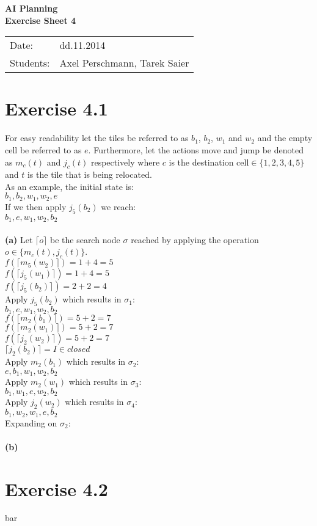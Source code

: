 \documentclass[11pt,a4paper]{article}
\begin{document}
\begin{center}
\Huge{\textbf{AI Planning}}\\
\LARGE{\textbf{Exercise Sheet 4}}
\end{center}
\vspace{2cm}
\begin{tabular}{ll}
Date: & dd.11.2014\\
Students: & Axel Perschmann, Tarek Saier
\end{tabular}

\section*{Exercise 4.1}
For easy readability let the tiles be referred to as $b_1$, $b_2$, $w_1$ and $w_2$ and the empty cell be referred to as $e$. Furthermore, let the actions move and jump be denoted as $m_c(t)$ and $j_c(t)$ respectively where $c$ is the destination cell$\in \{1,2,3,4,5\}$ and $t$ is the tile that is being relocated.\\
As an example, the initial state is:\\
$b_1,b_2,w_1,w_2,e$\\
If we then apply $j_5(b_2)$ we reach:\\
$b_1,e,w_1,w_2,b_2$\\
\\
\textbf{(a)} Let $\lceil o\rceil$ be the search node $\sigma$ reached by applying the operation $o\in \{m_c(t),j_c(t)\}$.\\
$f(\lceil m_5(w_2)\rceil)=1+4=5$\\
$f(\lceil j_5(w_1)\rceil)=1+4=5$\\
$f(\lceil j_5(b_2)\rceil)=2+2=4$\\
Apply $j_5(b_2)$ which results in $\sigma_1$:\\
$b_1,e,w_1,w_2,b_2$\\
$f(\lceil m_2(b_1)\rceil)=5+2=7$\\
$f(\lceil m_2(w_1)\rceil)=5+2=7$\\
$f(\lceil j_2(w_2)\rceil)=5+2=7$\\
$\lceil j_2(b_2)\rceil=I\in closed$\\
Apply $m_2(b_1)$ which results in $\sigma_2$:\\
$e,b_1,w_1,w_2,b_2$\\
Apply $m_2(w_1)$ which results in $\sigma_3$:\\
$b_1,w_1,e,w_2,b_2$\\
Apply $j_2(w_2)$ which results in $\sigma_4$:\\
$b_1,w_2,w_1,e,b_2$\\
Expanding on $\sigma_2$:\\
\\
\textbf{(b)}

\section*{Exercise 4.2}
bar
\end{document}
